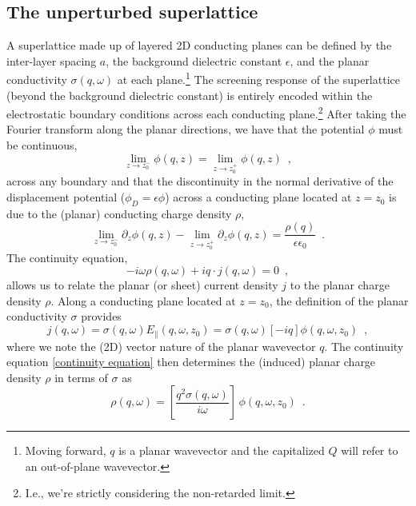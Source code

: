 \documentclass{article}
\newcommand{\lb}{\left[}
\newcommand{\rb}{\right]}
\newcommand{\e}{\epsilon}
\begin{document}
\subsection{The unperturbed superlattice}

A superlattice made up of layered 2D conducting planes can be defined by the inter-layer spacing $a$, the background dielectric constant $\e$, and the planar conductivity $\sigma(q,\omega)$ at each plane.\footnote{Moving forward, $q$ is a planar wavevector and the capitalized $Q$ will refer to an out-of-plane wavevector.}  The screening response of the superlattice (beyond the background dielectric constant) is entirely encoded within the electrostatic boundary conditions across each conducting plane.\footnote{I.e., we're strictly considering the non-retarded limit.}  After taking the Fourier transform along the planar directions, we have that the potential $\phi$ must be continuous,
\begin{equation}
    \label{phi continuity}
    \lim_{z\to z_0^-}\phi(q,z) = \lim_{z\to z_0^+}\phi(q,z)
    \,\,\,,
\end{equation}
across any boundary and that the discontinuity in the normal derivative of the displacement potential ($\phi_D = \e\phi$) across a conducting plane located at $z=z_0$ is due to the (planar) conducting charge density $\rho$,
\begin{equation}
    \label{phi discontinuity expression}
    \lim_{z\to z_0^-}\partial_z\phi(q,z) - \lim_{z\to z_0^+}\partial_z\phi(q,z) = \frac{\rho(q)}{\e\e_0}
    \,\,\,.
\end{equation}
The continuity equation,
\begin{equation}
\label{continuity equation}
    -i\omega\rho(q,\omega) +iq\cdot j(q,\omega) = 0
    \,\,\,,
\end{equation}
allows us to relate the planar (or sheet) current density $j$ to the planar charge density $\rho$.  Along a conducting plane located at $z=z_0$, the definition of the planar conductivity $\sigma$ provides
\begin{equation}
    \label{conductivity def}
    j(q,\omega) = \sigma(q,\omega) E_\parallel(q,\omega,z_0) = \sigma(q,\omega) \lb -i q\rb\phi(q,\omega,z_0)
    \,\,\,,
\end{equation}
where we note the (2D) vector nature of the planar wavevector $q$.  The continuity equation \eqref{continuity equation} then determines the (induced) planar charge density $\rho$ in terms of $\sigma$ as
\begin{equation}
\label{charge density conductivity relation}
\rho(q,\omega) =
\lb\frac{q^2\sigma(q,\omega)}{i\omega}\rb\,\phi(q,\omega,z_0)
\,\,\,.
\end{equation}
\end{document}

